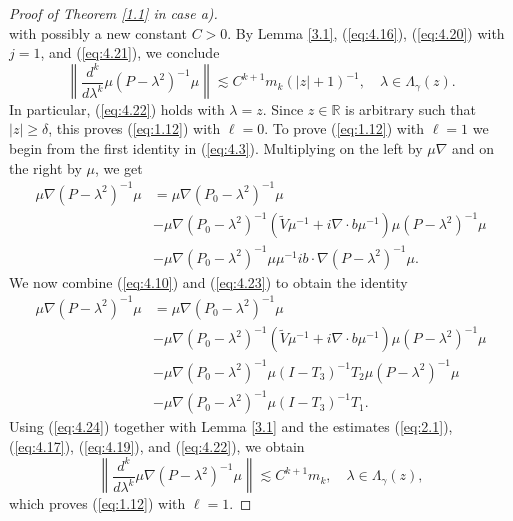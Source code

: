 \documentclass[11pt]{amsart}
\numberwithin{equation}{section}
\def\R{{\mathbb R}}
\begin{document}
\begin{proof}[Proof of Theorem \ref{1.1} in case a)]
\begin{equation}
\end{equation}
with possibly a new constant $C>0$. By Lemma \ref{3.1}, (\ref{eq:4.16}), (\ref{eq:4.20}) with $j=1$, and (\ref{eq:4.21}), we conclude
 \begin{equation}\label{eq:4.22}
\left\|\frac{d^k}{d\lambda^k}\mu(P-\lambda^2)^{-1}\mu\right\|\lesssim C^{k+1}m_k(|z|+1)^{-1},\quad \lambda\in\Lambda_\gamma(z).
\end{equation}
In particular, (\ref{eq:4.22}) holds with $\lambda=z$. Since $z\in\R$ is arbitrary such that $|z|\ge\delta$, this proves (\ref{eq:1.12})
with $\ell=0$. To prove (\ref{eq:1.12}) with $\ell=1$ we begin from the first identity in (\ref{eq:4.3}). Multiplying on the left by
$\mu\nabla$ and on the right by $\mu$, we get
\begin{equation}\label{eq:4.23}
\begin{split}
\mu\nabla(P-\lambda^2)^{-1}\mu&=\mu\nabla(P_0-\lambda^2)^{-1}\mu\\
&-\mu\nabla(P_0-\lambda^2)^{-1}(\widetilde V\mu^{-1}+i\nabla\cdot b\mu^{-1})\mu(P-\lambda^2)^{-1}\mu\\
&-\mu\nabla(P_0-\lambda^2)^{-1}\mu \mu^{-1}ib\cdot\nabla(P-\lambda^2)^{-1}\mu.
\end{split}
\end{equation}
We now combine (\ref{eq:4.10}) and (\ref{eq:4.23}) to obtain the identity
\begin{equation}\label{eq:4.24}
\begin{split}
\mu\nabla(P-\lambda^2)^{-1}\mu&=\mu\nabla(P_0-\lambda^2)^{-1}\mu\\
&-\mu\nabla(P_0-\lambda^2)^{-1}(\widetilde V\mu^{-1}+i\nabla\cdot b\mu^{-1})\mu(P-\lambda^2)^{-1}\mu\\
&-\mu\nabla(P_0-\lambda^2)^{-1}\mu(I-T_3)^{-1}T_2\mu(P-\lambda^2)^{-1}\mu\\
&-\mu\nabla(P_0-\lambda^2)^{-1}\mu (I-T_3)^{-1}T_1.
\end{split}
\end{equation}
Using (\ref{eq:4.24}) together with Lemma \ref{3.1} and the estimates (\ref{eq:2.1}), (\ref{eq:4.17}), (\ref{eq:4.19}), and (\ref{eq:4.22}), we obtain
\begin{equation}\label{eq:4.25}
\left\|\frac{d^k}{d\lambda^k}\mu\nabla(P-\lambda^2)^{-1}\mu\right\|\lesssim C^{k+1}m_k,\quad \lambda\in\Lambda_\gamma(z),
\end{equation}
which proves (\ref{eq:1.12}) with $\ell=1$.


\end{proof}
\end{document}
